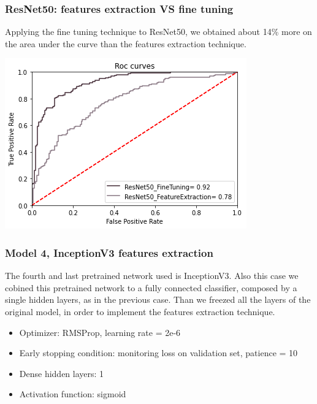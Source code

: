 \documentclass{article}
\begin{document}
\subsubsection{ResNet50: features extraction VS fine tuning}
Applying the fine tuning technique to ResNet50, we obtained about 14\% more on the area under the curve than the features extraction technique.
\begin{center}
\begin{minipage}{0.45\textwidth}
        \includegraphics[scale=0.6]{./img/rocResNet50.png}
    \end{minipage}
\end{center}






\subsubsection{Model 4, InceptionV3 features extraction}
The fourth and last pretrained network used is InceptionV3. Also this case we cobined this pretrained network to a fully connected classifier, composed by a single hidden layers, as in the previous case. Than we freezed all the layers of the original model, in order to implement the features extraction technique.

\begin{itemize}
\item Optimizer: RMSProp, learning rate = 2e-6
\item Early stopping condition: monitoring loss on validation set, patience = 10
\item Dense hidden layers: 1
\item Activation function: sigmoid
\end{itemize}
\end{document}
